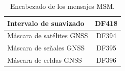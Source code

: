 \documentclass[a4paper,12pt,oneside,onecolumn,final,openright]{book}%
\begin{document}
\begin{table}[]
\begin{tabular}{|l|c|}
Intervalo de suavizado                              & DF418                                                                 \\ \hline
Máscara de satélites GNSS                           & DF394                                                                 \\ \hline
Máscara de señales GNSS                             & DF395                                                                 \\ \hline
Máscara de celdas GNSS                              & DF396                                                                 \\ \hline
\end{tabular}
    \caption{Encabezado de los mensajes MSM.}
    \label{tab:MSMheader}
\end{table}
\end{document}
